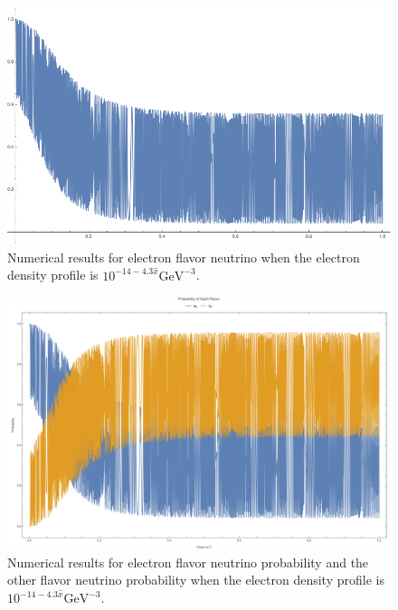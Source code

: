 \documentclass{tufte-handout}
\begin{document}
\begin{figure}
\centering
\includegraphics{assets/numMSW-model-1}
\caption{Numerical results for electron flavor neutrino when the electron density profile is $10^{-14 - 4.3\hat x} \mathrm{GeV}^{-3}$.}
\label{fig:numMSW-model-1}
\end{figure}

\begin{figure}
\centering
\includegraphics{assets/numericalMSW-model-3}
\caption{Numerical results for electron flavor neutrino probability and the other flavor neutrino probability when the electron density profile is $10^{-14 - 4.3\hat x} \mathrm{GeV}^{-3}$.}
\label{fig:numMSW-model-3}
\end{figure}
\end{document}
